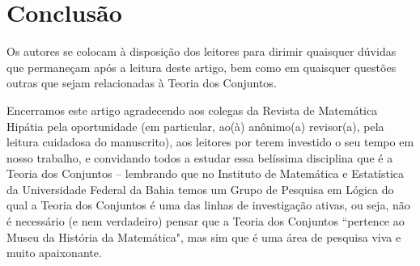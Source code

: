 \documentclass{hipatia}
\begin{document}
\begin{itemize}




\end{itemize}

\section{Conclusão}

Os autores se colocam à disposição dos
leitores para dirimir quaisquer dúvidas que
permaneçam após a leitura deste artigo, bem
como em quaisquer questões outras que sejam
relacionadas à Teoria dos Conjuntos. 

Encerramos este artigo agradecendo aos colegas
da Revista de Matemática Hipátia pela
oportunidade (em particular, ao(\`a) anônimo(a) revisor(a), pela leitura cuidadosa do 
manuscrito), aos leitores por terem investido
o seu tempo em nosso trabalho, e convidando
todos a estudar essa belíssima disciplina que
é a Teoria dos Conjuntos -- lembrando que no
Instituto de Matemática e Estatística da
Universidade Federal da Bahia temos um Grupo
de Pesquisa em Lógica do qual a Teoria dos
Conjuntos é uma das linhas de investigação
ativas, ou  seja, não é necessário (e nem
verdadeiro) pensar que a Teoria dos Conjuntos
``pertence ao Museu da História da
Matemática", mas sim que é uma área de
pesquisa viva e muito apaixonante.



\bigskip

\vfill

\newpage
\end{document}
